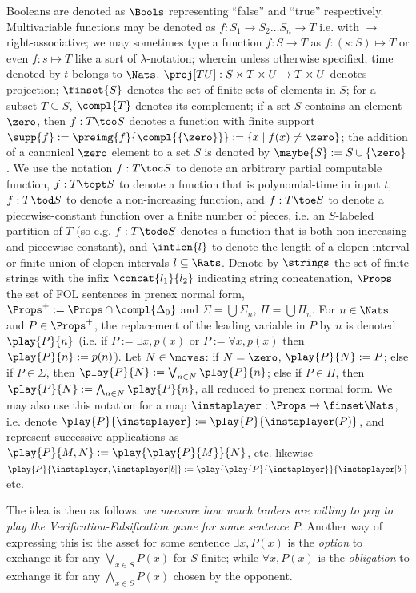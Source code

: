 \begin{notation*}
    Booleans are denoted as $\Bools$ representing ``false'' and ``true'' respectively. Multivariable functions may be denoted as $f:S_1\to S_2\dots S_n\to T$ i.e. with $\to$ right-associative; we may sometimes type a function $f:S\to T$ as $f:(s:S)\mapsto T$ or even $f:s\mapsto T$ like a sort of $\lambda$-notation; wherein unless otherwise specified, time denoted by $t$ belongs to $\Nats$. $\proj[TU]:S\times T\times U\to T\times U$ denotes projection; $\finset{S}$ denotes the set of finite sets of elements in $S$; for a subset $T\subseteq S$, $\compl{T}$ denotes its complement; if a set $S$ contains an element $\zero$, then $f:T\too S$ denotes a function with finite support $\supp{f}:=\preimg{f}{\compl{\{\zero\}}}:= \{x\mid f(x)\ne\zero\}$; the addition of a canonical $\zero$ element to a set $S$ is denoted by $\maybe{S}:=S\cup\{\zero\}$. We use the notation $f:T\toc S$ to denote an arbitrary partial computable function, $f:T\topt S$ to denote a function that is polynomial-time in input $t$, $f:T\tod S$ to denote a non-increasing function, and $f:T\toe S$ to denote a piecewise-constant function over a finite number of pieces, i.e. an $S$-labeled partition of $T$ (so e.g. $f:T\tode S$ denotes a function that is both non-increasing and piecewise-constant), and $\intlen{l}$ to denote the length of a clopen interval or finite union of clopen intervals $l\subseteq\Rats$. Denote by $\strings$ the set of finite strings with the infix $\concat{l_1}{l_2}$ indicating string concatenation, $\Props$ the set of FOL sentences in prenex normal form, $\Props^+:=\Props\cap\compl{\Delta_0}$ and $\Sigma=\bigcup\Sigma_n$, $\Pi=\bigcup\Pi_n$. For $n\in\Nats$ and $P\in\Props^+$, the replacement of the leading variable in $P$ by $n$ is denoted $\play{P}{n}$ (i.e. if $P:=\exists x,p(x)$ or $P:=\forall x,p(x)$ then $\play{P}{n}:=p(n)$). Let $N\in\moves$: if $N=\zero$, $\play{P}{N}:= P$; else if $P\in\Sigma$, then $\play{P}{N}:=\bigvee_{n\in N}\play{P}{n}$; else if $P\in\Pi$, then $\play{P}{N}:=\bigwedge_{n\in N}\play{P}{n}$, all reduced to prenex normal form. We may also use this notation for a map $\instaplayer:\Props\to\finset\Nats$, i.e. denote $\play{P}{\instaplayer}:=\play{P}{\instaplayer(P)}$, and represent successive applications as $\play{P}{M,N}:=\play{\play{P}{M}}{N}$, etc. likewise $\play{P}{\instaplayer,\instaplayer[b]}:=\play{\play{P}{\instaplayer}}{\instaplayer[b]}$ etc.
\end{notation*}

The idea is then as follows: \emph{we measure how much traders are willing to pay to play the Verification-Falsification game for some sentence $P$}. Another way of expressing this is: the asset for some sentence $\exists x,P(x)$ is the \emph{option} to exchange it for any $\bigvee_{x\in S}P(x)$ for $S$ finite; while $\forall x,P(x)$ is the \emph{obligation} to exchange it for any $\bigwedge_{x\in S}P(x)$ chosen by the opponent.

